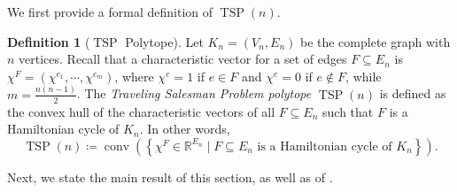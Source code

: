 \documentclass{article}
\theoremstyle{definition}
\newtheorem{definition}[theorem]{Definition}
\theoremstyle{remark}
\newcommand{\conv}{\operatorname{conv}}
\newcommand{\TSP}{\operatorname{TSP}}
\renewcommand{\R}{\mathbb{R}}
\begin{document}
We first provide a formal definition of $\TSP(n)$.

\begin{definition}[$\TSP$ Polytope]
Let $K_n = (V_n, E_n)$ be the complete graph with $n$ vertices. Recall that a characteristic vector for a set of edges $F \subseteq E_n$ is $\chi^F = \left(\chi^{e_1}, \cdots, \chi^{e_m}\right)$, where $\chi^e = 1$ if $e \in F$ and $\chi^e = 0$ if $e \notin F$, while $m = \frac{n(n-1)}{2}$. The \emph{Traveling Salesman Problem polytope} $\TSP(n)$ is defined as the convex hull of the characteristic vectors of all $F \subseteq E_n$ such that $F$ is a Hamiltonian cycle of $K_n$. In other words,
\[
\TSP(n) \coloneqq \conv\left(\left\{\chi^F \in \R^{E_n} \mid F \subseteq E_n \text{ is a Hamiltonian cycle of $K_n$}\right\}\right).
\]
\end{definition}

Next, we state the main result of this section, as well as of \cite{fiorini}.
\end{document}
